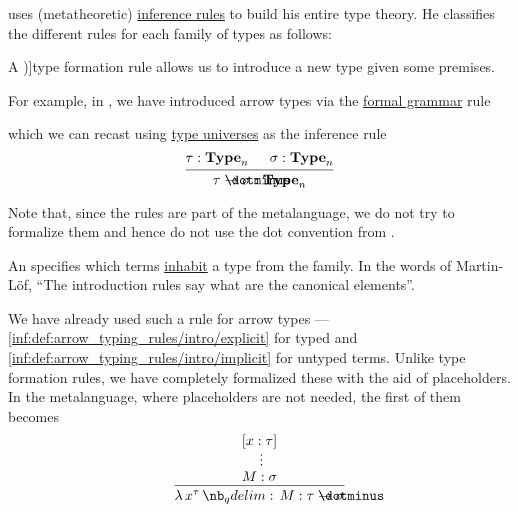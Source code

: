 \begin{remark}\label{rem:type_theory_rule_classification}
   uses (metatheoretic) \hyperref[def:inference_rule]{inference rules} to build his entire type theory. He classifies the different rules for each family of types as follows:
  \begin{thmenum}
     A \term[en=formation (rule) (\cite[\S 8.1.9]{Mimram2020ProgramEqualsProof})]{type formation} rule allows us to introduce a new type given some premises.

    For example, in , we have introduced arrow types via the \hyperref[def:formal_grammar/schema]{formal grammar} rule
    \begin{bnf*}
       {\bnftsq{(} \bnfsp {} \bnfsp \bnftsq{\( \synimplies \)} \bnfsp {} \bnfsp \bnftsq{)}}
    \end{bnf*}
    which we can recast using \hyperref[rem:type_universes]{type universes} as the inference rule
    \begin{equation*}
      \begin{prooftree}
        \hypo{ \tau: \op*{Type}_n }
        \hypo{ \sigma: \op*{Type}_n }
        \infer2{ \tau \synimplies \sigma: \op*{Type}_n }
      \end{prooftree}
    \end{equation*}

    Note that, since the rules are part of the metalanguage, we do not try to formalize them and hence do not use the dot convention from .

     An  specifies which terms \hyperref[def:type_habitation]{inhabit} a type from the family. In the words of Martin-L\"of, \enquote{The introduction rules say what are the canonical elements}.

    We have already used such a rule for arrow types --- \ref{inf:def:arrow_typing_rules/intro/explicit} for typed and \ref{inf:def:arrow_typing_rules/intro/implicit} for untyped terms. Unlike type formation rules, we have completely formalized these with the aid of placeholders. In the metalanguage, where placeholders are not needed, the first of them becomes
    \begin{equation*}
      \begin{prooftree}
        \hypo{ [x: \tau] }
        \ellipsis {} { M: \sigma }
        \infer1{ \qabs {x^{\tau}} M: \tau \synimplies \sigma }
      \end{prooftree}
    \end{equation*}


\end{thmenum}
\end{remark}
